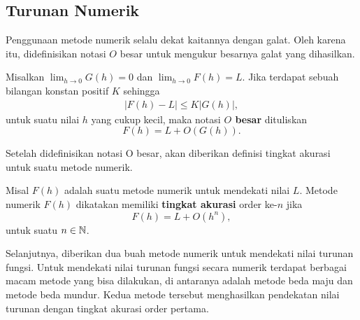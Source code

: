 \subsection{Turunan Numerik}

 Penggunaan metode numerik selalu dekat kaitannya dengan galat. Oleh karena itu, didefinisikan notasi $O$ besar untuk mengukur besarnya galat yang dihasilkan.

\begin{definisi}\citep{burden}\label{bigO}
    Misalkan $\lim_{h \to 0}G(h) = 0$ dan $\lim_{h \to 0}F(h) = L$. Jika terdapat sebuah bilangan konstan positif $K$ sehingga
    \begin{align*}
        |F(h) - L| \leq K|G(h)|,
    \end{align*}
    untuk suatu nilai $h$ yang cukup kecil, maka notasi \textbf{$O$ besar} dituliskan 
    $$F(h) = L + O(G(h)).$$
\end{definisi}

Setelah didefinisikan notasi O besar, akan diberikan definisi tingkat akurasi untuk suatu metode numerik.

\begin{definisi}
    Misal $F(h)$ adalah suatu metode numerik untuk mendekati nilai $L$. Metode numerik $F(h)$ dikatakan memiliki \textbf{tingkat akurasi} order ke-$n$ jika
    $$F(h) = L + O(h^n),$$
    untuk suatu $n \in \mathbb{N}$.
\end{definisi}

Selanjutnya, diberikan dua buah metode numerik untuk mendekati nilai turunan fungsi. Untuk mendekati nilai turunan fungsi secara numerik terdapat berbagai macam metode yang bisa dilakukan, di antaranya adalah metode beda maju dan metode beda mundur. Kedua metode tersebut menghasilkan pendekatan nilai turunan dengan tingkat akurasi order pertama.

